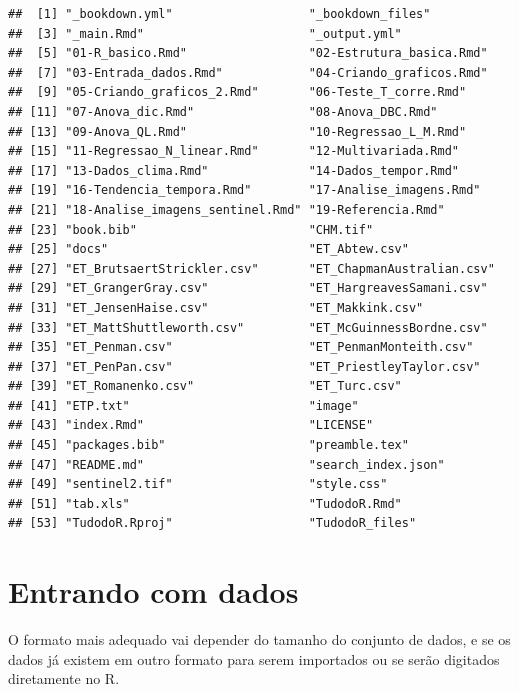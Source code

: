 \documentclass[
]{book}
\begin{document}
\begin{verbatim}
##  [1] "_bookdown.yml"                   "_bookdown_files"                
##  [3] "_main.Rmd"                       "_output.yml"                    
##  [5] "01-R_basico.Rmd"                 "02-Estrutura_basica.Rmd"        
##  [7] "03-Entrada_dados.Rmd"            "04-Criando_graficos.Rmd"        
##  [9] "05-Criando_graficos_2.Rmd"       "06-Teste_T_corre.Rmd"           
## [11] "07-Anova_dic.Rmd"                "08-Anova_DBC.Rmd"               
## [13] "09-Anova_QL.Rmd"                 "10-Regressao_L_M.Rmd"           
## [15] "11-Regressao_N_linear.Rmd"       "12-Multivariada.Rmd"            
## [17] "13-Dados_clima.Rmd"              "14-Dados_tempor.Rmd"            
## [19] "16-Tendencia_tempora.Rmd"        "17-Analise_imagens.Rmd"         
## [21] "18-Analise_imagens_sentinel.Rmd" "19-Referencia.Rmd"              
## [23] "book.bib"                        "CHM.tif"                        
## [25] "docs"                            "ET_Abtew.csv"                   
## [27] "ET_BrutsaertStrickler.csv"       "ET_ChapmanAustralian.csv"       
## [29] "ET_GrangerGray.csv"              "ET_HargreavesSamani.csv"        
## [31] "ET_JensenHaise.csv"              "ET_Makkink.csv"                 
## [33] "ET_MattShuttleworth.csv"         "ET_McGuinnessBordne.csv"        
## [35] "ET_Penman.csv"                   "ET_PenmanMonteith.csv"          
## [37] "ET_PenPan.csv"                   "ET_PriestleyTaylor.csv"         
## [39] "ET_Romanenko.csv"                "ET_Turc.csv"                    
## [41] "ETP.txt"                         "image"                          
## [43] "index.Rmd"                       "LICENSE"                        
## [45] "packages.bib"                    "preamble.tex"                   
## [47] "README.md"                       "search_index.json"              
## [49] "sentinel2.tif"                   "style.css"                      
## [51] "tab.xls"                         "TudodoR.Rmd"                    
## [53] "TudodoR.Rproj"                   "TudodoR_files"
\end{verbatim}

\hypertarget{entrando-com-dados}{%
\section{Entrando com dados}\label{entrando-com-dados}}

O formato mais adequado vai depender do tamanho do conjunto de dados, e se os dados já existem em outro formato para serem importados ou se serão digitados diretamente no R.
\end{document}
